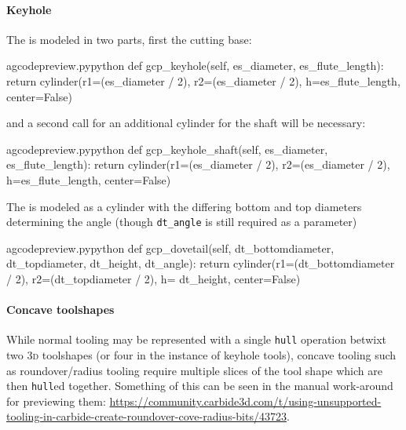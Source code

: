 \documentclass{ltxdoc}
\begin{document}
\begin{samepage}
\paragraph{Keyhole}

The  is modeled in two parts, first the cutting base:

\lstset{firstnumber=\thegcpy}
\begin{writecode}{a}{gcodepreview.py}{python}
    def gcp_keyhole(self, es_diameter, es_flute_length):
        return cylinder(r1=(es_diameter / 2), r2=(es_diameter / 2), h=es_flute_length, center=False)

\end{writecode}
\addtocounter{gcpy}{3}

\noindent and a second call for an additional cylinder for the shaft will be necessary:

\lstset{firstnumber=\thegcpy}
\begin{writecode}{a}{gcodepreview.py}{python}
    def gcp_keyhole_shaft(self, es_diameter, es_flute_length):
        return cylinder(r1=(es_diameter / 2), r2=(es_diameter / 2), h=es_flute_length, center=False)

\end{writecode}
\addtocounter{gcpy}{3}
\end{samepage}

The  is modeled as a cylinder with the differing bottom and top diameters determining the angle (though \verb|dt_angle| is still required as a parameter)

\lstset{firstnumber=\thegcpy}
\begin{writecode}{a}{gcodepreview.py}{python}
    def gcp_dovetail(self, dt_bottomdiameter, dt_topdiameter, dt_height, dt_angle):
        return cylinder(r1=(dt_bottomdiameter / 2), r2=(dt_topdiameter / 2), h= dt_height, center=False)

\end{writecode}
\addtocounter{gcpy}{3}

\paragraph{Concave toolshapes}
\label{para:concavetoolshapes} 
While normal tooling may be represented with a single \texttt{hull} operation betwixt two \textsc{3d} toolshapes (or four in the instance of keyhole tools), concave tooling such as roundover/radius tooling require multiple slices of the tool shape which are then \texttt{hull}ed together. Something of this can be seen in the manual work-around for previewing them: \url{https://community.carbide3d.com/t/using-unsupported-tooling-in-carbide-create-roundover-cove-radius-bits/43723}.
\end{document}
